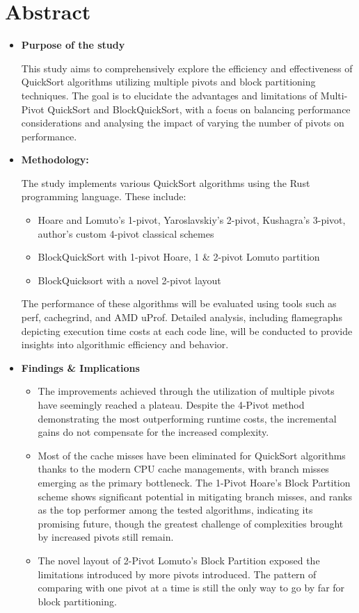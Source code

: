 \documentclass[a4paper,oneside,12pt]{book}
\begin{document}
\chapter*{Abstract}
\begin{itemize}
    \item \textbf{Purpose of the study}
    
    This study aims to comprehensively explore the efficiency and effectiveness of QuickSort algorithms utilizing multiple pivots and block partitioning techniques. The goal is to elucidate the advantages and limitations of Multi-Pivot QuickSort and BlockQuickSort, with a focus on balancing performance considerations and analysing the impact of varying the number of pivots on performance.

    \item \textbf{Methodology:}

    The study implements various QuickSort algorithms using the Rust programming language. These include:

    \begin{itemize}
        \item Hoare and Lomuto's 1-pivot, Yaroslavskiy's 2-pivot, Kushagra's 3-pivot, author's custom 4-pivot classical schemes
        \item BlockQuickSort with 1-pivot Hoare, 1 \& 2-pivot Lomuto partition
        \item BlockQuicksort with a novel 2-pivot layout
    \end{itemize}

    The performance of these algorithms will be evaluated using tools such as perf, cachegrind, and AMD uProf. Detailed analysis, including flamegraphs depicting execution time costs at each code line, will be conducted to provide insights into algorithmic efficiency and behavior.
    
    \item \textbf{Findings \& Implications}
    
    \begin{itemize}
        \item The improvements achieved through the utilization of multiple pivots have seemingly reached a plateau. Despite the 4-Pivot method demonstrating the most outperforming runtime costs, the incremental gains do not compensate for the increased complexity.
        \item Most of the cache misses have been eliminated for QuickSort algorithms thanks to the modern CPU cache managements, with branch misses emerging as the primary bottleneck. The 1-Pivot Hoare's Block Partition scheme shows significant potential in mitigating branch misses,
             and ranks as the top performer among the tested algorithms, indicating its promising future, though the greatest challenge of complexities brought by increased pivots still remain.
        \item The novel layout of 2-Pivot Lomuto's Block Partition exposed the limitations introduced by more pivots introduced. The pattern of comparing with one pivot at a time is still the only way to go by far for block partitioning.
    \end{itemize}
\end{itemize}
\end{document}
